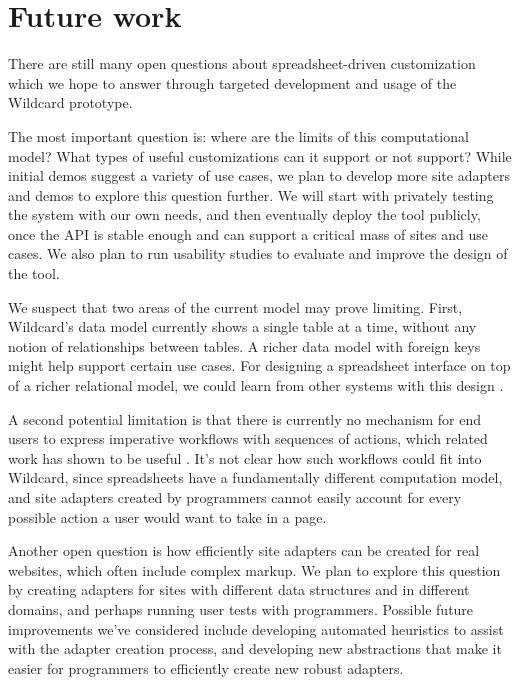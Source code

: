 \documentclass[english,submission]{programming}
\begin{document}
\hypertarget{future-work}{%
\section{Future work}\label{future-work}}

There are still many open questions about spreadsheet-driven
customization which we hope to answer through targeted development and
usage of the Wildcard prototype.

The most important question is: where are the limits of this
computational model? What types of useful customizations can it support
or not support? While initial demos suggest a variety of use cases, we
plan to develop more site adapters and demos to explore this question
further. We will start with privately testing the system with our own
needs, and then eventually deploy the tool publicly, once the API is
stable enough and can support a critical mass of sites and use cases. We
also plan to run usability studies to evaluate and improve the design of
the tool.

We suspect that two areas of the current model may prove limiting.
First, Wildcard's data model currently shows a single table at a time,
without any notion of relationships between tables. A richer data model
with foreign keys might help support certain use cases. For designing a
spreadsheet interface on top of a richer relational model, we could
learn from other systems with this design
\autocite{mccutchen2016,bakke2016}.

A second potential limitation is that there is currently no mechanism
for end users to express imperative workflows with sequences of actions,
which related work has shown to be useful
\autocite{bolin2005,leshed2008}. It's not clear how such workflows could
fit into Wildcard, since spreadsheets have a fundamentally different
computation model, and site adapters created by programmers cannot
easily account for every possible action a user would want to take in a
page.

Another open question is how efficiently site adapters can be created
for real websites, which often include complex markup. We plan to
explore this question by creating adapters for sites with different data
structures and in different domains, and perhaps running user tests with
programmers. Possible future improvements we've considered include
developing automated heuristics to assist with the adapter creation
process, and developing new abstractions that make it easier for
programmers to efficiently create new robust adapters.
\end{document}
